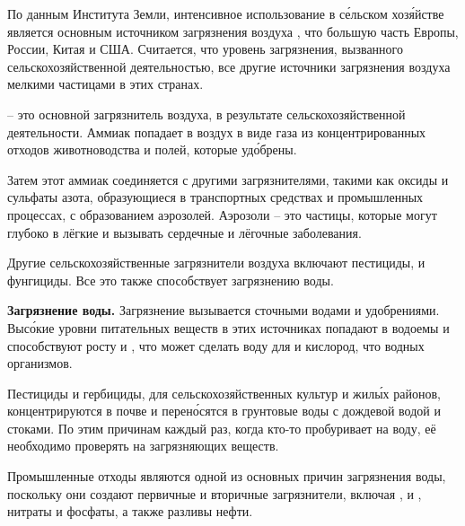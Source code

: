 По данным Института Земли, интенсивное использование  в с\'{е}льском хоз\'{я}йстве является основным источником загрязнения воздуха , что  большую часть Европы, России, Китая и США. Считается, что уровень загрязнения, вызванного сельскохозяйственной деятельностью,  все другие источники загрязнения воздуха мелкими частицами в этих странах.

 -- это основной загрязнитель воздуха,  в результате сельскохозяйственной деятельности. Аммиак попадает в воздух в виде газа из концентрированных отходов животноводства и полей, которые  уд\'{о}брены.

Затем этот  аммиак соединяется с другими загрязнителями, такими как оксиды и сульфаты азота, образующиеся в транспортных средствах и промышленных процессах, с образованием аэрозолей. Аэрозоли -- это  частицы, которые могут  глубоко в лёгкие и вызывать сердечные и лёгочные заболевания.

Другие сельскохозяйственные загрязнители воздуха включают пестициды,  и фунгициды. Все это также способствует загрязнению воды.

\textbf{Загрязнение воды.}
Загрязнение  вызывается сточными водами и удобрениями. Выс\'{о}кие уровни питательных веществ в этих источниках попадают в водоемы и способствуют росту  и , что может сделать воду  для  и  кислород, что  водных организмов.

Пестициды и гербициды,  для сельскохозяйственных культур и жил\'{ы}х районов, концентрируются в почве и перен\'{о}сятся в грунтовые воды с дождевой водой и стоками. По этим причинам каждый раз, когда кто-то пробуривает  на воду, её необходимо проверять на  загрязняющих веществ.

Промышленные отходы являются одной из основных причин загрязнения воды, поскольку они создают первичные и вторичные загрязнители, включая ,  и , нитраты и фосфаты, а также разливы нефти.

